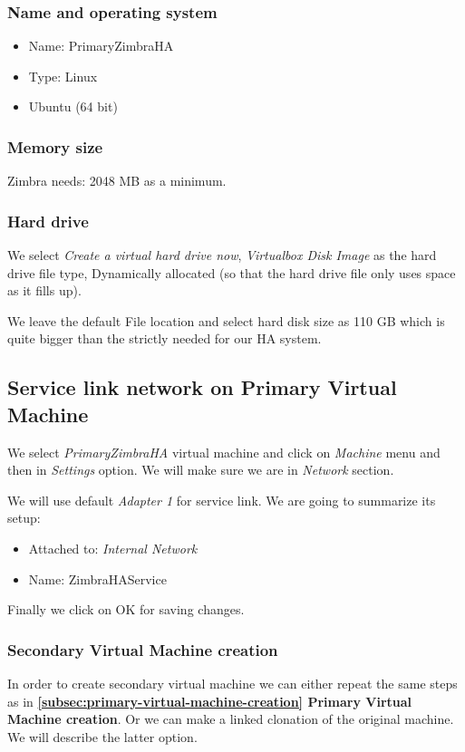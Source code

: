 \subsubsection {Name and operating system}
\begin{itemize}
  \item Name: PrimaryZimbraHA
  \item Type: Linux
  \item Ubuntu (64 bit)
\end{itemize}

\subsubsection {Memory size}
Zimbra needs: 2048 MB as a minimum.
\subsubsection {Hard drive}
We select \textit{Create a virtual hard drive now}, \textit{Virtualbox Disk Image} as the hard drive file type, Dynamically allocated (so that the hard drive file only uses space as it fills up).

We leave the default File location and select hard disk size as 110 GB which is quite bigger than the strictly needed for our HA system.

\subsection {\label{subsec:service-link-primary}Service link network on Primary Virtual Machine}
We select \textit{PrimaryZimbraHA} virtual machine and click on \textit{Machine} menu and then in \textit{Settings} option. We will make sure we are in \textit{Network} section.

We will use default \textit{Adapter 1} for service link. We are going to summarize its setup:
\begin{itemize}
  \item Attached to: \textit{Internal Network}
  \item Name: ZimbraHAService
\end{itemize}

Finally we click on OK for saving changes.

\subsubsection {Secondary Virtual Machine creation}
In order to create secondary virtual machine we can either repeat the same steps as in \textbf{\ref{subsec:primary-virtual-machine-creation} Primary Virtual Machine creation}. Or we can make a linked clonation of the original machine. We will describe the latter option.

